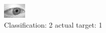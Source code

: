 \begin{figure}[h!]
\begin{center}
\includegraphics[width=0.60\columnwidth]{figures/ID2766_class_2_target_1.png}
\end{center}
\caption{ Classification: 2 actual target: 1}
\label{fig:ID2766_class_2_target_1}
\end{figure}
